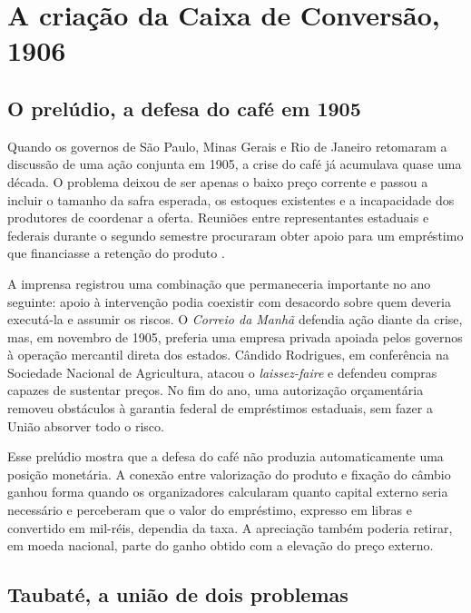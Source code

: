 \chapter{A criação da Caixa de Conversão, 1906}
\label{cap:criacao}

\section{O prelúdio, a defesa do café em 1905}

Quando os governos de São Paulo, Minas Gerais e Rio de Janeiro retomaram a discussão de uma ação conjunta em 1905, a crise do café já acumulava quase uma década. O problema deixou de ser apenas o baixo preço corrente e passou a incluir o tamanho da safra esperada, os estoques existentes e a incapacidade dos produtores de coordenar a oferta. Reuniões entre representantes estaduais e federais durante o segundo semestre procuraram obter apoio para um empréstimo que financiasse a retenção do produto \cite{holloway1978,torelli2004}.

A imprensa registrou uma combinação que permaneceria importante no ano seguinte: apoio à intervenção podia coexistir com desacordo sobre quem deveria executá-la e assumir os riscos. O \textit{Correio da Manhã} defendia ação diante da crise, mas, em novembro de 1905, preferia uma empresa privada apoiada pelos governos à operação mercantil direta dos estados. Cândido Rodrigues, em conferência na Sociedade Nacional de Agricultura, atacou o \textit{laissez-faire} e defendeu compras capazes de sustentar preços. No fim do ano, uma autorização orçamentária removeu obstáculos à garantia federal de empréstimos estaduais, sem fazer a União absorver todo o risco.


Esse prelúdio mostra que a defesa do café não produzia automaticamente uma posição monetária. A conexão entre valorização do produto e fixação do câmbio ganhou forma quando os organizadores calcularam quanto capital externo seria necessário e perceberam que o valor do empréstimo, expresso em libras e convertido em mil-réis, dependia da taxa. A apreciação também poderia retirar, em moeda nacional, parte do ganho obtido com a elevação do preço externo.

\section{Taubaté, a união de dois problemas}

